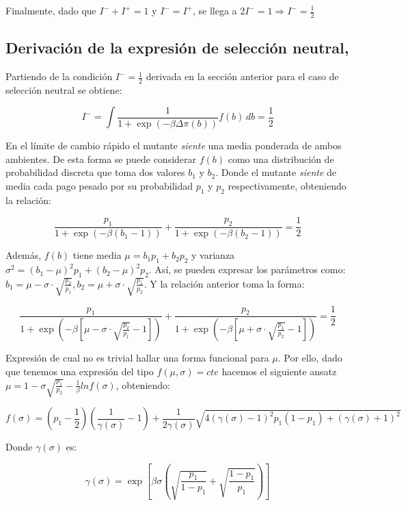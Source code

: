 \documentclass[%
 sor,
 jor,
 amsmath,amssymb,
 reprint,%
]{revtex4-2}
\begin{document}
\vspace{0,4 cm}
Finalmente, dado que \(I^-+I^+=1\) y \(I^-=I^+\), se llega a \(2I^-=1\Rightarrow I^-=\frac{1}{2}\)

\subsection{Derivación de la expresión de selección neutral, \cite{Ruben}}

Partiendo de la condición $I^- = \frac{1}{2}$ derivada en la sección anterior para el caso de selección neutral se obtiene:

\[
    I^- = \int \frac{1}{1 + \exp\left(- \beta \Delta \pi(b)\right)} f(b) \, db = \frac{1}{2}
\]

En el límite de cambio rápido el mutante \textit{siente} una media ponderada de ambos ambientes. De esta forma se puede considerar $f(b)$ como
una distribución de probabilidad discreta que toma dos valores $b_1$ y $b_2$. Donde el mutante \textit{siente} de media cada pago pesado por su probabilidad $p_1$ y $p_2$ respectivamente, obteniendo la relación:

\[
    \frac{p_1}{1 + \exp\left(- \beta (b_1 -1)\right)} + \frac{p_2}{1 + \exp\left(- \beta (b_2 -1)\right)} = \frac{1}{2}
\]

Además, $f(b)$ tiene media $\mu = b_1p_1 + b_2p_2$ y varianza $\sigma^2 = (b_1 - \mu)^2p_1 + (b_2 - \mu)^2p_2$. Así, se pueden expresar los parámetros como: $b_1 = \mu - \sigma \cdot \sqrt{ \frac{p_2}{p_1} },
b_2 = \mu + \sigma \cdot \sqrt{ \frac{p_1}{p_2} }$. Y la relación anterior toma la forma:

\[
 \frac{p_1}{1 + \exp\left(-\beta \left[ \mu - \sigma \cdot \sqrt{\frac{p_2}{p_1}} -1 \right] \right)} + 
\frac{p_2}{1 + \exp\left(-\beta \left[ \mu + \sigma \cdot \sqrt{\frac{p_1}{p_2}} -1 \right] \right)} = \frac{1}{2}
\]

Expresión de cual no es trivial hallar una forma funcional para $\mu$. Por ello, dado que tenemos una expresión del tipo $f(\mu, \sigma) = cte$ hacemos el siguiente ansatz $\mu = 1 -\sigma \sqrt{\frac{p_1}{p_2}} - \frac{1}{\beta}  ln f(\sigma)$, obteniendo:

\[
f(\sigma) = \left( p_1 - \frac{1}{2} \right) \left( \frac{1}{\gamma(\sigma)} - 1 \right)
+ \frac{1}{2\gamma(\sigma)} 
\sqrt{4(\gamma(\sigma) - 1)^2 p_1 (1 - p_1) + (\gamma(\sigma) + 1)^2}
\]

Donde \( \gamma(\sigma) \) es:

\[
\gamma(\sigma) = \exp\left[
\beta \sigma \left( 
\sqrt{ \frac{p_1}{1 - p_1} } + \sqrt{ \frac{1 - p_1}{p_1} }
\right)
\right]
\]


\nocite{*}
\end{document}
